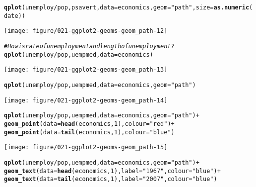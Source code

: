 \documentclass[a4paper,titlepage]{tufte-handout}\usepackage[]{graphicx}\usepackage[]{color}
\makeatletter
\def\maxwidth{ %
  \ifdim\Gin@nat@width>\linewidth
    \linewidth
  \else
    \Gin@nat@width
  \fi
}
\newcommand{\hlnum}[1]{\textcolor[rgb]{0.686,0.059,0.569}{#1}}%
\newcommand{\hlstr}[1]{\textcolor[rgb]{0.192,0.494,0.8}{#1}}%
\newcommand{\hlcom}[1]{\textcolor[rgb]{0.678,0.584,0.686}{\textit{#1}}}%
\newcommand{\hlopt}[1]{\textcolor[rgb]{0,0,0}{#1}}%
\newcommand{\hlstd}[1]{\textcolor[rgb]{0.345,0.345,0.345}{#1}}%
\newcommand{\hlkwc}[1]{\textcolor[rgb]{0.333,0.667,0.333}{#1}}%
\newcommand{\hlkwd}[1]{\textcolor[rgb]{0.737,0.353,0.396}{\textbf{#1}}}%
\newenvironment{kframe}{%
 \def\at@end@of@kframe{}%
 \ifinner\ifhmode%
  \def\at@end@of@kframe{\end{minipage}}%
  \begin{minipage}{\columnwidth}%
 \fi\fi%
 \def\FrameCommand##1{\hskip\@totalleftmargin \hskip-\fboxsep
 \colorbox{shadecolor}{##1}\hskip-\fboxsep
     \hskip-\linewidth \hskip-\@totalleftmargin \hskip\columnwidth}%
 \MakeFramed {\advance\hsize-\width
   \@totalleftmargin\z@ \linewidth\hsize
   \@setminipage}}%
 {\par\unskip\endMakeFramed%
 \at@end@of@kframe}
\newenvironment{knitrout}{}{} %
\makeatother
\begin{document}
\begin{knitrout}
\begin{kframe}
\begin{alltt}
\hlkwd{qplot}\hlstd{(unemploy}\hlopt{/}\hlstd{pop, psavert,} \hlkwc{data}\hlstd{=economics,} \hlkwc{geom}\hlstd{=}\hlstr{"path"}\hlstd{,} \hlkwc{size}\hlstd{=}\hlkwd{as.numeric}\hlstd{(date))}
\end{alltt}
\end{kframe}
\texttt{[image: figure/021-ggplot2-geoms-geom\_path-12]} 
\begin{kframe}\begin{alltt}
\hlcom{# How is rate of unemployment and length of unemployment?}
\hlkwd{qplot}\hlstd{(unemploy}\hlopt{/}\hlstd{pop, uempmed,} \hlkwc{data}\hlstd{=economics)}
\end{alltt}
\end{kframe}
\texttt{[image: figure/021-ggplot2-geoms-geom\_path-13]} 
\begin{kframe}\begin{alltt}
\hlkwd{qplot}\hlstd{(unemploy}\hlopt{/}\hlstd{pop, uempmed,} \hlkwc{data}\hlstd{=economics,} \hlkwc{geom}\hlstd{=}\hlstr{"path"}\hlstd{)}
\end{alltt}
\end{kframe}
\texttt{[image: figure/021-ggplot2-geoms-geom\_path-14]} 
\begin{kframe}\begin{alltt}
\hlkwd{qplot}\hlstd{(unemploy}\hlopt{/}\hlstd{pop, uempmed,} \hlkwc{data}\hlstd{=economics,} \hlkwc{geom}\hlstd{=}\hlstr{"path"}\hlstd{)} \hlopt{+}
  \hlkwd{geom_point}\hlstd{(}\hlkwc{data}\hlstd{=}\hlkwd{head}\hlstd{(economics,} \hlnum{1}\hlstd{),} \hlkwc{colour}\hlstd{=}\hlstr{"red"}\hlstd{)} \hlopt{+}
  \hlkwd{geom_point}\hlstd{(}\hlkwc{data}\hlstd{=}\hlkwd{tail}\hlstd{(economics,} \hlnum{1}\hlstd{),} \hlkwc{colour}\hlstd{=}\hlstr{"blue"}\hlstd{)}
\end{alltt}
\end{kframe}
\texttt{[image: figure/021-ggplot2-geoms-geom\_path-15]} 
\begin{kframe}\begin{alltt}
\hlkwd{qplot}\hlstd{(unemploy}\hlopt{/}\hlstd{pop, uempmed,} \hlkwc{data}\hlstd{=economics,} \hlkwc{geom}\hlstd{=}\hlstr{"path"}\hlstd{)} \hlopt{+}
  \hlkwd{geom_text}\hlstd{(}\hlkwc{data}\hlstd{=}\hlkwd{head}\hlstd{(economics,} \hlnum{1}\hlstd{),} \hlkwc{label}\hlstd{=}\hlstr{"1967"}\hlstd{,} \hlkwc{colour}\hlstd{=}\hlstr{"blue"}\hlstd{)} \hlopt{+}
  \hlkwd{geom_text}\hlstd{(}\hlkwc{data}\hlstd{=}\hlkwd{tail}\hlstd{(economics,} \hlnum{1}\hlstd{),} \hlkwc{label}\hlstd{=}\hlstr{"2007"}\hlstd{,} \hlkwc{colour}\hlstd{=}\hlstr{"blue"}\hlstd{)}

\end{alltt}
\end{kframe}
\end{knitrout}
\end{document}
